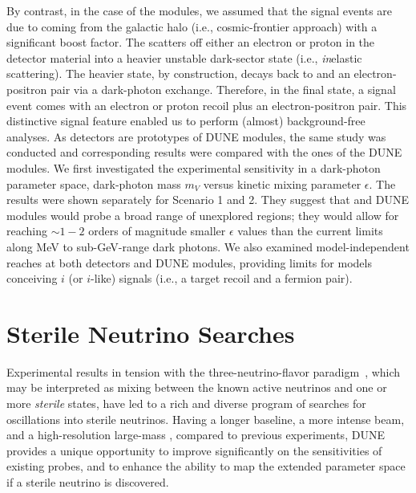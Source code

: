 By contrast, in the case of the  modules, we assumed that the signal events are due to  coming from the galactic halo (i.e., cosmic-frontier approach) with a significant boost factor. The  scatters off either an electron or proton in the detector material into a heavier unstable dark-sector state (i.e., \textit{in}elastic scattering). 
The heavier state, by construction, decays back to  and an electron-positron pair via a dark-photon exchange. 
Therefore, in the final state, a signal event comes with an electron or proton recoil plus an electron-positron pair. 
This distinctive signal feature enabled us to perform (almost) background-free analyses. 
As  detectors are prototypes of DUNE  modules, the same study was conducted and corresponding results were compared with the ones of the DUNE  modules.  
We first investigated the experimental sensitivity in a dark-photon parameter space, dark-photon mass $m_V$ versus kinetic mixing parameter $\epsilon$. 
The results were shown separately for Scenario 1 and 2. 
They suggest that  and DUNE  modules would probe a broad range of unexplored regions; they would allow for reaching $\sim 1-2$ orders of magnitude smaller $\epsilon$ values than the current limits along MeV to sub-GeV-range dark photons. 
We also examined model-independent reaches at both  detectors and DUNE  modules, providing limits for models conceiving $i$ (or $i$-like) signals (i.e., a target recoil and a fermion pair). 



\section{Sterile Neutrino Searches}
Experimental results in tension with the three-neutrino-flavor paradigm~\cite{LSNDSterile,MiniBooNESterile,GalliumSummary,ReactorSummary}, which may be interpreted as mixing between the known active neutrinos and one or more \textit{sterile} states, have led to a rich and diverse program of searches for oscillations into sterile neutrinos. Having a longer baseline, a more intense beam, and a high-resolution large-mass , %
compared to previous experiments, DUNE provides a unique opportunity to improve significantly on the sensitivities of existing probes, and to enhance the ability to map the extended parameter space if a sterile neutrino is discovered.
	
